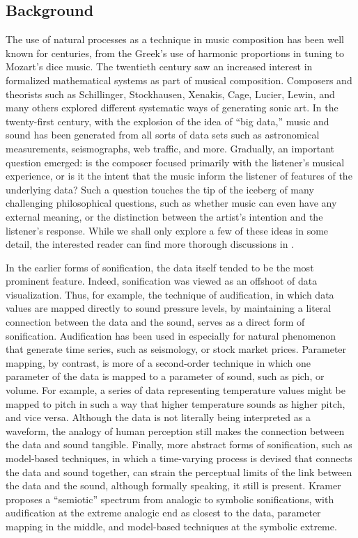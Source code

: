 \subsection{Background}
\label{sec:background}
The use of natural processes as a technique in music composition has been well known for centuries, from the Greek's use of harmonic proportions in tuning to Mozart's dice music. The twentieth century saw an increased interest in formalized mathematical systems as part of musical composition. Composers and theorists such as Schillinger, Stockhausen, Xenakis, Cage, Lucier, Lewin, and many others explored different systematic ways of generating sonic art. In the twenty-first century, with the explosion of the idea of ``big data,'' music and sound has been generated from all sorts of data sets such as astronomical measurements, seismographs, web traffic, and more. Gradually, an important question emerged: is the composer focused primarily with the listener's musical experience, or is it the intent that the music inform the listener of features of the underlying data? Such a question touches the tip of the iceberg of many challenging philosophical questions, such as whether music can even have any external meaning, or the distinction between the artist's intention and the listener's response. While we shall only explore a few of these ideas in some detail, the interested reader can find more thorough discussions in .

In the earlier forms of sonification, the data itself tended to be the most prominent feature. Indeed, sonification was viewed as an offshoot of data visualization. Thus, for example, the technique of audification, in which data values are mapped directly to sound pressure levels, by maintaining a literal connection between the data and the sound, serves as a direct form of sonification. Audification has been used in especially for natural phenomenon that generate time series, such as seismology, or stock market prices. Parameter mapping, by contrast, is more of a second-order technique in which one parameter of the data is mapped to a parameter of sound, such as pich, or volume. For example, a series of data representing temperature values might be mapped to pitch in such a way that higher temperature sounds as higher pitch, and vice versa. Although the data is not literally being interpreted as a waveform, the analogy of human perception still makes the connection between the data and sound tangible. Finally, more abstract forms of sonification, such as model-based techniques, in which a time-varying process is devised that connects the data and sound together, can strain the perceptual limits of the link between the data and the sound, although formally speaking, it still is present. Kramer proposes a ``semiotic'' spectrum from analogic to symbolic sonifications, with audification at the extreme analogic end as closest to the data, parameter mapping in the middle, and model-based techniques at the symbolic extreme.

